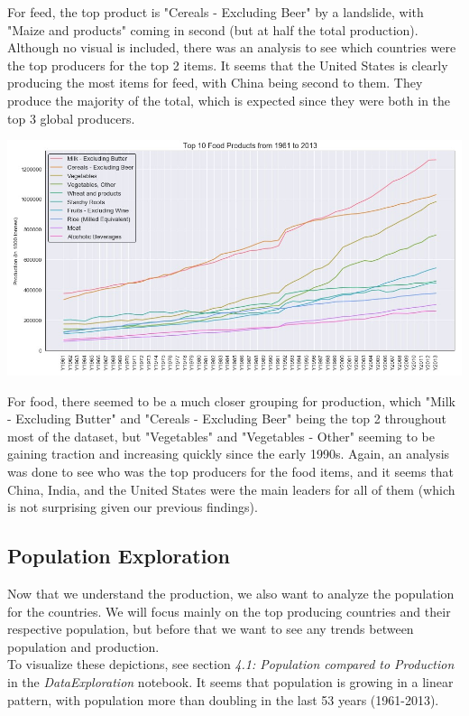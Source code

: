 \documentclass[12pt, a4paper]{article}
\begin{document}
\begin{spacing}{1.1}
	\noindent For feed, the top product is "Cereals - Excluding Beer" by a landslide, with "Maize and products" coming in second (but at half the total production). Although no visual is included, there was an analysis to see which countries were the top producers for the top 2 items. It seems that the United States is clearly producing the most items for feed, with China being second to them. They produce the majority of the total, which is expected since they were both in the top 3 global producers.
	\begin{center}
	\includegraphics[scale=.6]{yearly_food} 
	\end{center}
	For food, there seemed to be a much closer grouping for production, which "Milk - Excluding Butter" and "Cereals - Excluding Beer" being the top 2 throughout most of the dataset, but "Vegetables" and "Vegetables - Other" seeming to be gaining traction and increasing quickly since the early 1990s. Again, an analysis was done to see who was the top producers for the food items, and it seems that China, India, and the United States were the main leaders for all of them (which is not surprising given our previous findings). \vspace*{2mm}
	
	\subsection{Population Exploration}
	Now that we understand the production, we also want to analyze the population for the countries. We will focus mainly on the top producing countries and their respective population, but before that we want to see any trends between population and production. \vspace*{2mm}\\
	To visualize these depictions, see section \textit{4.1: Population compared to Production} in the \textit{DataExploration} notebook. It seems that population is growing in a linear pattern, with population more than doubling in the last 53 years (1961-2013). \newpage
	

\end{spacing}
\end{document}
